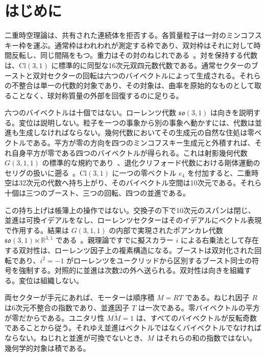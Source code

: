 \documentclass[a4paper]{article}
\begin{document}
\section{はじめに}
\label{sec:introduction}

二重時空理論は、共有された連続体を拒否する。各質量粒子は一対のミンコフスキー枠を運ぶ。通常枠はわれわれが測定する枠であり、双対枠はそれに対して時間反転し、同じ間隔をもつ。重力はその対のねじれである~\cite{Hestenes2015,DoranLasenby2003}。対を保持する代数は、\(\mathrm{Cl}(3,1)\) に標準的に同型な16次元双四元数代数である。通常セクターのブーストと双対セクターの回転は六つのバイベクトルによって生成される。それらの不整合は単一の代数的対象であり、その対象は、曲率を原始的なものとして取ることなく、球対称質量の外部を回復するのに足りる。

六つのバイベクトルは十個ではない。ローレンツ代数 \(\mathfrak{so}(3,1)\) は向きを説明する。変位は説明しない。粒子を一つの事象から別の事象へ動かすには、代数は並進も生成しなければならない。幾何代数においてその生成元の自然な住処は零ベクトルである。平方が零の方向を四つのミンコフスキー生成元と外積すれば、それ自身平方が零である四つのバイベクトルが得られる。これは射影幾何代数 \(G(3,1,1)\) の標準的な規約であり~\cite{Gunn2017,Lengyel2024,DeKeninckDorst2019,GunnDeKeninck2019}、退化クリフォード代数における剛体運動のセリグの扱いに遡る~\cite{Selig2005}。\(\mathrm{Cl}(3,1)\) に一つの零ベクトル \(e_{4}\) を付加すると、二重時空は32次元の代数へ持ち上がり、そのバイベクトル空間は10次元である。それら十個は三つのブースト、三つの回転、四つの並進である。

この持ち上げは帳簿上の操作ではない。交換子の下で10次元のスパンは閉じ、並進は可換イデアルをなし、ローレンツセクターはそのイデアルにベクトル表現で作用する。結果は \(G(3,1,1)\) の内部で実現されたポアンカレ代数 \(\mathfrak{so}(3,1)\ltimes\mathbb{R}^{3,1}\) である~\cite{Weinberg1995,Tung1985}。親理論ですでに擬スカラー \(i\) による右乗法として存在する双対性は、ローレンツ因子上の複素構造になる。ブーストは双対化された回転であり、\(i^{2}=-1\) がローレンツをユークリッドから区別するブースト同士の符号を強制する。対照的に並進は次数2の外へ送られる。双対性は向きを組織する。変位は組織しない。

両セクターが手元にあれば、モーターは順序積 \(M=RT\) である。ねじれ因子 \(R\) は6次元不整合の指数であり、並進因子 \(T\) は一次である。零バイベクトルの平方が零だからである。ユニタリ性 \(M\widetilde{M}=1\) は、すべてのバイベクトルが反転奇数であることから従う。それゆえ並進はベクトルではなくバイベクトルでなければならない。ねじれと並進が可換でないとき、\(M\) はそれらの和の指数ではない。幾何学的対象は積である。
\end{document}
